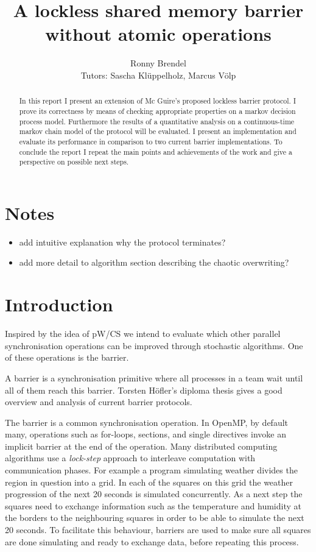 \documentclass[a4paper, 10pt]{article}
\title{A lockless shared memory barrier without atomic operations}
\author{Ronny Brendel\\Tutors: Sascha Kl\"uppelholz, Marcus V\"olp}
\begin{document}
\section*{Notes}
\begin{itemize}
	\item add intuitive explanation why the protocol terminates?
	\item add more detail to algorithm section describing the chaotic overwriting?
\end{itemize}

\pagebreak

\maketitle

\begin{abstract}
In this report I present an extension of Mc Guire's proposed lockless barrier protocol. I prove its correctness by means of checking appropriate properties on a markov decision process model. Furthermore the results of a quantitative analysis on a continuous-time markov chain model of the protocol will be evaluated. I present an implementation and evaluate its performance in comparison to two current barrier implementations. To conclude the report I repeat the main points and achievements of the work and give a perspective on possible next steps.
\end{abstract}

\section{Introduction}
Inspired by the idea of pW/CS\cite{pwcs} we intend to evaluate which other parallel synchronisation operations can be improved through stochastic algorithms. One of these operations is the barrier.

A barrier is a synchronisation primitive where all processes in a team wait until all of them reach this barrier. Torsten H\"ofler's diploma thesis\cite{hoefler2005} gives a good overview and analysis of current barrier protocols.

The barrier is a common synchronisation operation. In OpenMP\cite{omp}, by default many, operations such as for-loops, sections, and single directives invoke an implicit barrier at the end of the operation. Many distributed computing algorithms use a \emph{lock-step} approach to interleave computation with communication phases. For example a program simulating weather divides the region in question into a grid. In each of the squares on this grid the weather progression of the next 20 seconds is simulated concurrently. As a next step the squares need to exchange information such as the temperature and humidity at the borders to the neighbouring squares in order to be able to simulate the next 20 seconds. To facilitate this behaviour, barriers are used to make sure all squares are done simulating and ready to exchange data, before repeating this process.
\end{document}
